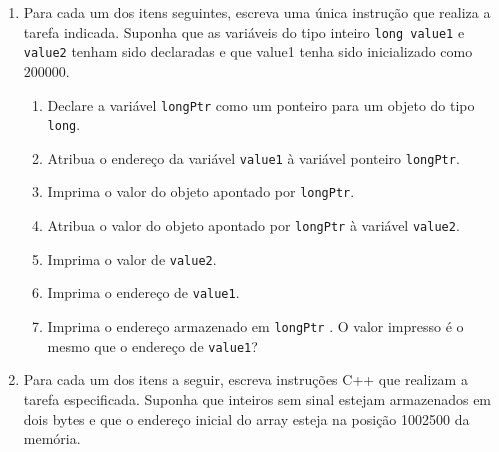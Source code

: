 \documentclass[fleqn]{article}
\begin{document}

\begin{enumerate}

   \item{
      Para cada um dos itens seguintes, escreva uma única instrução que realiza a tarefa indicada. Suponha que as variáveis do tipo inteiro \texttt{long value1} e \texttt{value2} tenham sido declaradas e que value1 tenha sido inicializado como $200000$.
      \begin{enumerate}
         \item{Declare a variável \texttt{longPtr} como um ponteiro para um objeto do tipo \texttt{long}.}
         \item{Atribua o endereço da variável \texttt{value1} à variável ponteiro \texttt{longPtr}.}
         \item{Imprima o valor do objeto apontado por \texttt{longPtr}.}
         \item{Atribua o valor do objeto apontado por \texttt{longPtr} à variável \texttt{value2}.}
         \item{Imprima o valor de \texttt{value2}.}
         \item{Imprima o endereço de \texttt{value1}.}
         \item{Imprima o endereço armazenado em \texttt{longPtr} . O valor impresso é o mesmo que o endereço de \texttt{value1}?}
      \end{enumerate}
   }

   \item{
      Para cada um dos itens a seguir, escreva instruções C++ que realizam a tarefa especificada. Suponha que inteiros sem sinal estejam armazenados em dois bytes e que o endereço inicial do array esteja na posição 1002500 da memória.

}
\end{enumerate}
\end{document}
